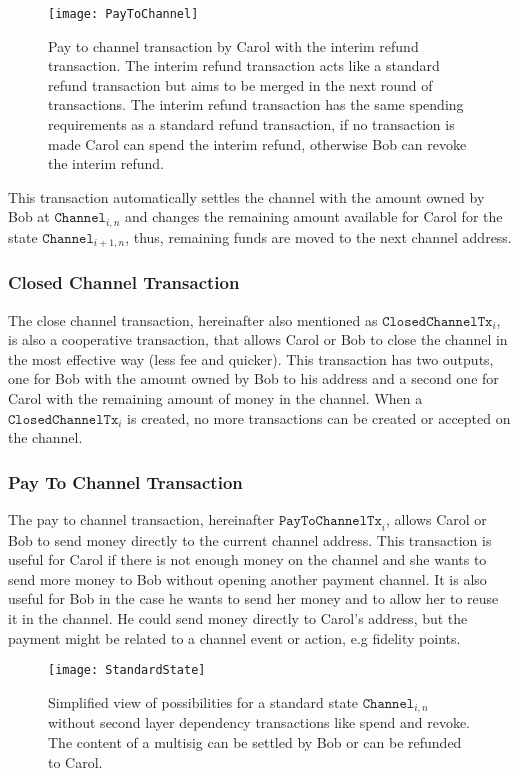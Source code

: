 \documentclass{llncs}
\begin{document}
\begin{figure}[H]
  \centering \texttt{[image: PayToChannel]}
  \caption{Pay to channel transaction by Carol with the interim refund
transaction. The interim refund transaction acts like a standard refund
transaction but aims to be merged in the next round of transactions. The interim
refund transaction has the same spending requirements as a standard refund
transaction, if no transaction is made Carol can spend the interim refund,
otherwise Bob can revoke the interim refund.}
\end{figure}

This transaction automatically settles the channel with the amount owned by Bob
at $\texttt{Channel}_{i,n}$ and changes the remaining amount available for Carol
for the state $\texttt{Channel}_{i+1,n}$, thus, remaining funds are moved to the
next channel address.

\subsubsection{Closed Channel Transaction} The close channel transaction,
hereinafter also mentioned as $\texttt{ClosedChannelTx}_{i}$, is also a
cooperative transaction, that allows Carol or Bob to close the channel in the
most effective way (less fee and quicker). This transaction has two outputs, one
for Bob with the amount owned by Bob to his address and a second one for Carol
with the remaining amount of money in the channel. When a
$\texttt{ClosedChannelTx}_{i}$ is created, no more transactions can be created
or accepted on the channel.

\subsubsection{Pay To Channel Transaction} The pay to channel transaction,
hereinafter $\texttt{PayToChannelTx}_{i}$, allows Carol or Bob to send money
directly to the current channel address. This transaction is useful for Carol if
there is not enough money on the channel and she wants to send more money to Bob
without opening another payment channel. It is also useful for Bob in the case
he wants to send her money and to allow her to reuse it in the channel. He could
send money directly to Carol's address, but the payment might be related to a
channel event or action, e.g fidelity points.

\begin{figure} \centering \texttt{[image: StandardState]}
  \caption{Simplified view of possibilities for a standard state
$\texttt{Channel}_{i,n}$ without second layer dependency transactions like spend
and revoke. The content of a multisig can be settled by Bob or can be refunded
to Carol.}
\end{figure}
\end{document}
